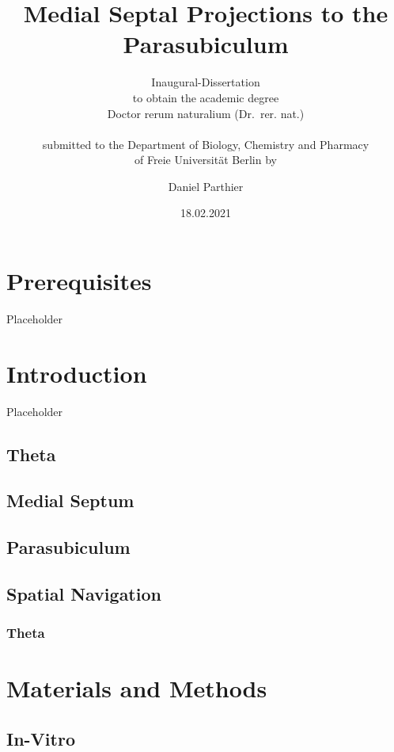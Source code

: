\documentclass[
  12pt,
]{book}
\title{Medial Septal Projections to the Parasubiculum}
\subtitle{Inaugural-Dissertation\\
to obtain the academic degree\\
Doctor rerum naturalium (Dr.~rer. nat.)\\
~\\
submitted to the Department of Biology, Chemistry and Pharmacy\\
of Freie Universität Berlin by}
\author{Daniel Parthier}
\date{18.02.2021}
\begin{document}
\maketitle

{
\setcounter{tocdepth}{1}
\tableofcontents
}
\hypertarget{prerequisites}{%
\chapter{Prerequisites}\label{prerequisites}}

Placeholder

\hypertarget{intro}{%
\chapter{Introduction}\label{intro}}

Placeholder

\hypertarget{theta}{%
\section{Theta}\label{theta}}

\hypertarget{medial-septum}{%
\section{Medial Septum}\label{medial-septum}}

\hypertarget{parasubiculum}{%
\section{Parasubiculum}\label{parasubiculum}}

\hypertarget{spatial-navigation}{%
\section{Spatial Navigation}\label{spatial-navigation}}

\hypertarget{theta-1}{%
\subsection{Theta}\label{theta-1}}

\hypertarget{materials-and-methods}{%
\chapter{Materials and Methods}\label{materials-and-methods}}

\hypertarget{in-vitro}{%
\section{In-Vitro}\label{in-vitro}}
\end{document}
